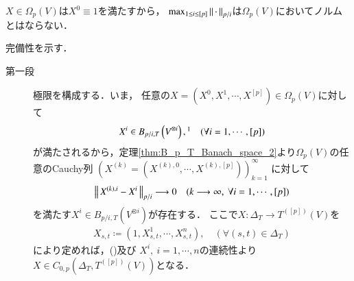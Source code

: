 	$X \in \Omega_p(V)$は$X^0 \equiv 1$を満たすから，
	$\operatorname*{max}_{1 \leq i \leq [p]} \left\|\, \cdot\, \right\|_{p/i}$は$\Omega_p(V)$においてノルムとはならない．
	
	\begin{prf}完備性を示す．
		\begin{description}
			\item[第一段] 極限を構成する．いま，
			任意の$X = (X^0,X^1,\cdots,X^{[p]}) \in \Omega_p(V)$に対して
			\begin{align}
				X^i \in B_{p/i,T}\left( V^{\otimes i} \right),\footnotemark
				\quad (\forall i=1,\cdots,[p]) 
			\end{align}
			が満たされるから，定理\ref{thm:B_p_T_Banach_space_2}より$\Omega_p(V)$の任意のCauchy列
			$\left( X^{(k)} = (X^{(k),0},\cdots,X^{(k),[p]}) \right)_{k=1}^{\infty}$
			に対して
			\begin{align}
				\left\|\, X^{(k),i} - X^i\, \right\|_{p/i} \longrightarrow 0
				\quad (k \longrightarrow \infty,\ \forall i=1,\cdots,[p])
				\label{eq:thm_p_rough_path_complete_dist_2}
			\end{align}
			を満たす$X^i \in B_{p/i,T}\left( V^{\otimes i} \right)$が存在する．
			ここで$X:\Delta_T \longrightarrow T^{([p])}(V)$を
			\begin{align}
				X_{s,t} \coloneqq (1,X^1_{s,t},\cdots,X^n_{s,t}),
				\quad (\forall (s,t) \in \Delta_T)
			\end{align}
			により定めれば，()及び
			$X^i,\ i=1,\cdots,n$の連続性より
			$X \in C_{0,p} \left(\Delta_T,T^{([p])}(V) \right)$となる．
		

\end{description}
\end{prf}
